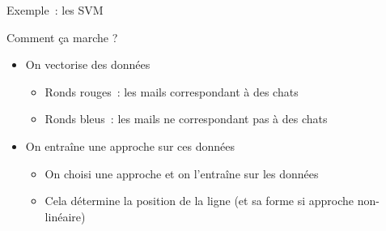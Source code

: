 \documentclass[serif, aspectratio=169]{beamer}
\begin{document}
\begin{frame}{Exemple~: les SVM}
    \begin{block}{Comment ça marche ?}
        \begin{itemize}
            \item On vectorise des données
            \begin{itemize}
                \item Ronds rouges~: les mails correspondant à des chats
                \item Ronds bleus~: les mails ne correspondant pas à des chats
            \end{itemize}
            \vspace{10pt}
            \item On entraîne une approche sur ces données
            \begin{itemize}
                \item On choisi une approche et on l'entraîne sur les données
                \item Cela détermine la position de la ligne (et sa forme si approche non-linéaire)
            \end{itemize}
        \end{itemize}
    \end{block}
    \vfill
\end{frame}
\end{document}
